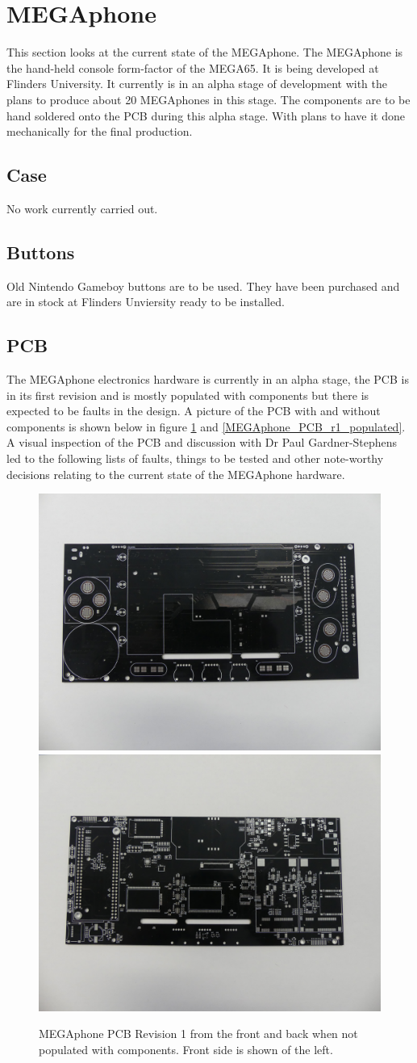 \section{MEGAphone}
This section looks at the current state of the MEGAphone. The MEGAphone is the hand-held console form-factor of the MEGA65. It is being developed at Flinders University. It currently is in an alpha stage of development with the plans to produce about 20 MEGAphones in this stage. The components are to be hand soldered onto the PCB during this alpha stage. With plans to have it done mechanically for the final production.

\subsection{Case}
No work currently carried out.

\subsection{Buttons}
Old Nintendo Gameboy buttons are to be used. They have been purchased and are in stock at Flinders Unviersity ready to be installed. 


\subsection{PCB}
The MEGAphone electronics hardware is currently in an alpha stage, the PCB is in its first revision and is mostly populated with components but there is expected to be faults in the design. A picture of the PCB with and without components is shown below in figure \ref{MEGAphone_PCB_r1_empty} and \ref{MEGAphone_PCB_r1_populated}. A visual inspection of the PCB and discussion with Dr Paul Gardner-Stephens led to the following lists of faults, things to be tested and other note-worthy decisions relating to the current state of the MEGAphone hardware. \\

\begin{figure} \begin{center}
\includegraphics[width=.3\linewidth]{pics/MEGAphone_PCB_r1_empty_front} 
\includegraphics[width=.3\linewidth]{pics/MEGAphone_PCB_r1_empty_back} 
\end{center} 
\caption{MEGAphone PCB Revision 1 from the front and back when not populated with components. Front side is shown of the left.\\}
\label{MEGAphone_PCB_r1_empty}
\end{figure}

